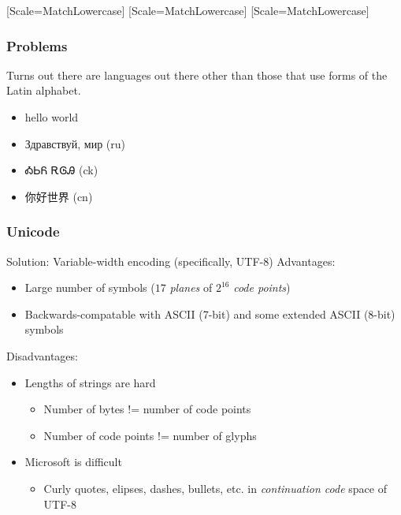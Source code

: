 \documentclass[smaller,xcolor=table,aspectratio=169]{beamer}
\begin{document}
\newfontface{}[Scale=MatchLowercase]
\newfontface{}[Scale=MatchLowercase]
\newfontface{}[Scale=MatchLowercase]
\newcommand{\hebtxt}[1]%
    {\bgroup\textdir TRT\hebfont #1\egroup}

\begin{frame}
  \frametitle{Problems}
  Turns out there are languages out there other than those that use forms of the Latin alphabet.
  \begin{itemize}
    \item<1-> hello world
    \item<2-> Здравствуй, мир (ru)
    \item<3-> {\chkfont ᎣᏏᏲ ᎡᎶᎯ} (ck)
    \item<4-> {\chnfont 你好世界} (cn)
  \end{itemize}
\end{frame}

\begin{frame}
  \frametitle{Unicode}
  Solution:  Variable-width encoding (specifically, UTF-8)
  Advantages:
  \begin{itemize}
    \item Large number of symbols ($17$ {\em planes} of $2^{16}$ {\em code points})
    \item Backwards-compatable with ASCII (7-bit) and some extended ASCII (8-bit) symbols
  \end{itemize}
  Disadvantages:
  \begin{itemize}
    \item Lengths of strings are hard
    \begin{itemize}
      \item Number of bytes != number of code points
      \item Number of code points != number of glyphs
    \end{itemize}
    \item Microsoft is difficult
    \begin{itemize}
      \item Curly quotes, elipses, dashes, bullets, etc. in {\em continuation code} space of UTF-8
    \end{itemize}
  \end{itemize}
\end{frame}
\end{document}
